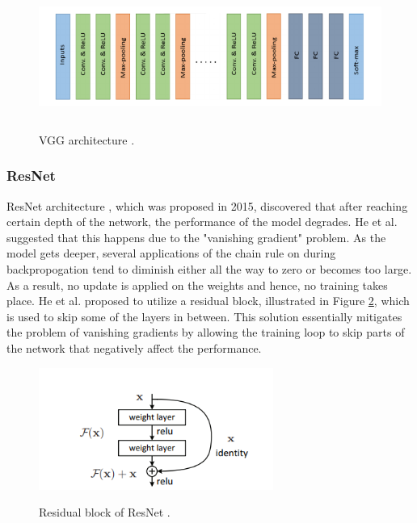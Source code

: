 \begin{figure}[htb]
	\begin{center}
		\includegraphics[height=4cm]{./vgg.png}
	\end{center}
	\caption{VGG architecture \cite{alom01}.}
	\begin{center}
		\label{VGG}
	\end{center}
\end{figure}
\FloatBarrier

\subsubsection{ResNet}
ResNet architecture \cite{He2015}, which was proposed in 2015, discovered that after reaching certain depth of the network, the performance of the model degrades. He et al. \cite{He2015} suggested that this happens due to the "vanishing gradient" problem. As the model gets deeper, several applications of the chain rule on during backpropogation tend to diminish either all the way to zero or becomes too large. As a result, no update is applied on the weights and hence, no training takes place. He et al. proposed to utilize a residual block, illustrated in Figure \ref{resnet}, which is used to skip some of the layers in between.  This solution essentially mitigates the problem of vanishing gradients by allowing the training loop to skip parts of the network that negatively affect the performance.

\begin{figure}[htb]
	\begin{center}
		\includegraphics[height=4cm]{./resnet.png}
	\end{center}
	\caption{Residual block of ResNet \cite{He2015}.}
	\begin{center}
		\label{resnet}
	\end{center}
\end{figure}

